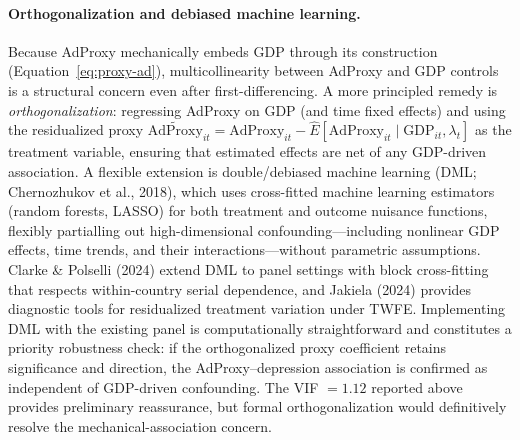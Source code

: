 \documentclass[a4paper,11pt,titlepage]{article}
\begin{document}
\paragraph{Orthogonalization and debiased machine learning.}
Because AdProxy mechanically embeds GDP through its construction (Equation~\ref{eq:proxy-ad}), multicollinearity between AdProxy and GDP controls is a structural concern even after first-differencing. A more principled remedy is \textit{orthogonalization}: regressing AdProxy on GDP (and time fixed effects) and using the residualized proxy $\widetilde{\text{AdProxy}}_{it} = \text{AdProxy}_{it} - \hat{E}[\text{AdProxy}_{it} \mid \text{GDP}_{it}, \lambda_t]$ as the treatment variable, ensuring that estimated effects are net of any GDP-driven association. A flexible extension is double/debiased machine learning (DML; Chernozhukov et al., 2018), which uses cross-fitted machine learning estimators (random forests, LASSO) for both treatment and outcome nuisance functions, flexibly partialling out high-dimensional confounding---including nonlinear GDP effects, time trends, and their interactions---without parametric assumptions. Clarke \& Polselli (2024) extend DML to panel settings with block cross-fitting that respects within-country serial dependence, and Jakiela (2024) provides diagnostic tools for residualized treatment variation under TWFE. Implementing DML with the existing panel is computationally straightforward and constitutes a priority robustness check: if the orthogonalized proxy coefficient retains significance and direction, the AdProxy--depression association is confirmed as independent of GDP-driven confounding. The VIF $= 1.12$ reported above provides preliminary reassurance, but formal orthogonalization would definitively resolve the mechanical-association concern.
\end{document}
